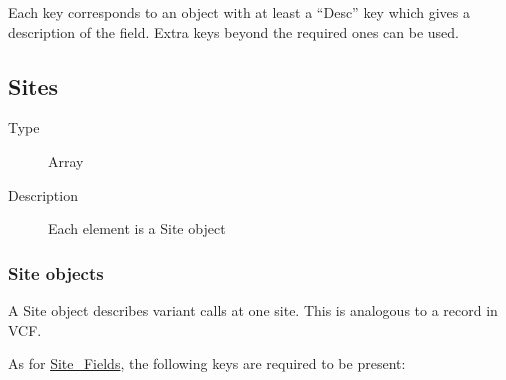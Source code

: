Each key corresponds to an object with at least a ``Desc'' key which
gives a description of the field. Extra keys beyond the required ones
can be used.

\hypertarget{sites}{%
\subsection{Sites}\label{sites}}

\begin{description}
\item[Type]
Array
\item[Description]
Each element is a Site object
\end{description}

\hypertarget{site_obj}{%
\subsubsection{Site objects}\label{site_obj}}

A Site object describes variant calls at one site. This is analogous to
a record in VCF.

As for \protect\hyperlink{site_fields}{Site\_Fields}, the following keys
are required to be present:

